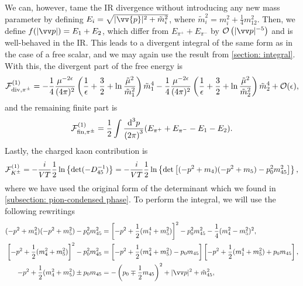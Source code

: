 We can, however, tame the IR divergence without introducing any new mass parameter by defining $E_i = \sqrt{|\vv{p}|^2 + \tilde m_i^2}$, where $\tilde m_i^2 = m_i^2 + \frac{1}{4} m_{12}^2$.
Then, we define $f(|\vv p|) = E_1 + E_2$, which differ from $E_{\pi^+} + E_{\pi^-}$ by $\Oh\left(|\vv p|^{-5}\right)$ and is well-behaved in the IR.
This leads to a divergent integral of the same form as in the case of a free scalar, and we may again use the result from \autoref{section: integral}.
With this, the divergent part of the free energy is
%
\begin{equation}
    \mathcal{F}^{(1)}_{\mathrm{div}, {\pi^\pm} }
    =
    - \frac{1}{4} \frac{\mu^{-2 \epsilon}}{(4\pi)^2} 
    \left(
        \frac{1}{\epsilon} + \frac{3}{2} + \ln \frac{\tilde \mu^2}{\tilde m_1^2}
    \right) \tilde m_1^4
    - \frac{1}{4} \frac{\mu^{-2 \epsilon}}{(4\pi)^2} 
    \left(
        \frac{1}{\epsilon} + \frac{3}{2} + \ln \frac{\tilde \mu^2}{\tilde m_2^2}
    \right) \tilde m_2^4
    + \mathcal{O}(\epsilon),
\end{equation}
%
and the remaining finite part is
%
\begin{equation}
    \mathcal{F}^{(1)}_{\mathrm{fin}, {\pi^\pm}}
    = 
    \frac{1}{2} \int \frac{\text{d}^3 p}{{(2\pi)}^3} (E_{\pi^+} + E_{\pi^-} - E_1 - E_2).
\end{equation}
%
Lastly, the charged kaon contribution is
%
\begin{equation}
    \mathcal{F}^{(1)}_{{K^\pm}}
    =
    -\frac{i}{VT}\frac{1}{2}
    \ln\left\{ 
        \det(-D_{45}^{-1})
    \right\}
    =
    -\frac{i}{VT}\frac{1}{2}
    \ln\left\{ 
        \det\left[(- p^2 + m_4)(- p^2 + m_5) - p_0^2m_{45}^2\right]
    \right\},
\end{equation}
%
where we have used the original form of the determinant which we found in \autoref{subsection: pion-condensed phase}.
To perform the integral, we will use the following rewritings
%
\begin{align}
    (-p^2 + m_4^2)(-p^2 + m_5^2) - p_0^2 m_{45}^2
    &
    = \left[-p^2 + \frac{1}{2}(m_1^4 + m_5^2)\right]^2 
    - p_0^2 m_{45}^2 - \frac{1}{4}(m_4^2 - m_5^2)^2, \\
    \left[-p^2 + \frac{1}{2}(m_4^2 + m_5^2)\right]^2 - p_0^2 m_{45}^2
    &
    = \left[-p^2 + \frac{1}{2}(m_4^2 + m_5^2) - p_0 m_{45} \right]
    \left[-p^2 + \frac{1}{2}(m_1^4 + m_5^2) + p_0 m_{45} \right], \\
    - p^2 + \frac{1}{2}(m_4^2 + m_5^2) \pm p_0 m_{45}
    &= - \left(p_0 \mp \frac{1}{2}m_{45}\right)^2 + |\vv p|^2 
    + 
    \tilde m_{45}^2, 
\end{align}
